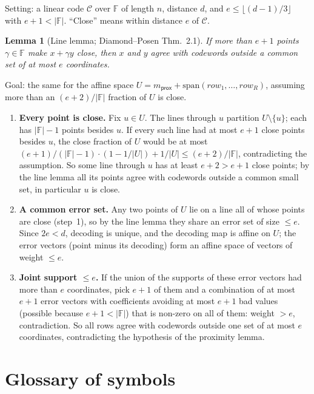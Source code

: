 \documentclass[11pt,a4paper]{article}
\newcommand{\F}{\mathbb{F}}
\theoremstyle{definition}
\theoremstyle{plain}
\newtheorem{lemma}[definition]{Lemma}
\begin{document}
Setting: a linear code $\mathcal C$ over $\F$ of length $n$, distance $d$, and $e\le\lfloor(d-1)/3\rfloor$ with
$e+1<|\F|$. ``Close'' means within distance $e$ of $\mathcal C$.

\begin{lemma}[Line lemma; Diamond--Posen Thm.~2.1]
If more than $e+1$ points $\gamma\in\F$ make $x+\gamma y$ close, then $x$ and $y$ agree with codewords outside a
common set of at most $e$ coordinates.
\end{lemma}

Goal: the same for the affine space $U=m_{\mathsf{prox}}+\mathrm{span}(\mathit{row}_1,\dots,\mathit{row}_R)$, assuming
more than an $(e+2)/|\F|$ fraction of $U$ is close.

\begin{enumerate}[leftmargin=1.5em]
\item \textbf{Every point is close.} Fix $u\in U$. The lines through $u$ partition $U\setminus\{u\}$; each has
  $|\F|-1$ points besides $u$. If every such line had at most $e+1$ close points besides $u$, the close
  fraction of $U$ would be at most $(e+1)/(|\F|-1)\cdot(1-1/|U|)+1/|U|\le(e+2)/|\F|$, contradicting the
  assumption. So some line through $u$ has at least $e+2>e+1$ close points; by the line lemma all its points
  agree with codewords outside a common small set, in particular $u$ is close.
\item \textbf{A common error set.} Any two points of $U$ lie on a line all of whose points are close (step~1),
  so by the line lemma they share an error set of size $\le e$. Since $2e<d$, decoding is unique, and the
  decoding map is affine on $U$; the error vectors (point minus its decoding) form an affine space of vectors
  of weight $\le e$.
\item \textbf{Joint support $\le e$.} If the union of the supports of these error vectors had more than $e$
  coordinates, pick $e+1$ of them and a combination of at most $e+1$ error vectors with coefficients avoiding at
  most $e+1$ bad values (possible because $e+1<|\F|$) that is non-zero on all of them: weight $>e$, contradiction.
  So all rows agree with codewords outside one set of at most $e$ coordinates, contradicting the hypothesis
  of the proximity lemma.
\end{enumerate}

\section{Glossary of symbols}
\label{sec:glossary}
\end{document}
